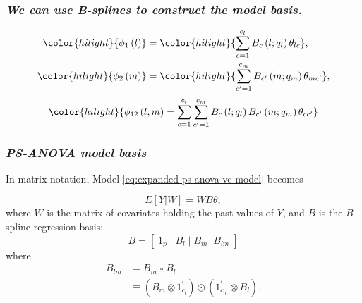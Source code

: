 \documentclass[12pt]{beamer}
\newcommand{\newmaththought}[1]{{ \color{hilight} {#1}}}
\begin{document}
\begin{frame}
\frametitle{\emph{We can use B-splines to construct the model basis.}}

\begin{align}  
\begin{split}\label{eq:l-m-marginal-basis}
\newmaththought{\phi_1\left(l\right) } &= \newmaththought{\sum_{c=1}^{c_l} B_{c}\left(l;q_l\right) \theta_{lc }}, \\
\newmaththought{\phi_2\left(m\right) } &= \newmaththought{\sum_{{c^\prime}=1}^{c_m} B_{c^\prime}\left(m;q_m\right)\theta_{mc^\prime } },
\end{split}
\end{align}
\begin{equation} \label{eq:PSANOVA-interaction-term} 
\newmaththought{ \phi_{12}\left(l,m\right)  = \sum_{c=1}^{c_l} \sum_{{c^\prime}=1}^{c_m} B_{c}\left(l;q_l\right) B_{c^\prime  }\left(m;q_m\right)\theta_{c c^\prime } }
\end{equation} 
\end{frame}


\begin{frame}
\frametitle{\emph{PS-ANOVA model basis}}

In matrix notation, Model \ref{eq:expanded-ps-anova-vc-model} becomes

\begin{equation*}  
E \left[ Y | W \right] = WB \theta,
\end{equation*}
\noindent
where $W$ is the matrix of covariates holding the past values of $Y$, and $B$ is the $B$-spline regression basis:
\begin{equation} \label{eq:SANOVA-basis-matrix}
B = \left[\; 1_p \; \vert \;  B_l  \; \vert \;   B_m \; \vert B_{lm} \; \right]
\end{equation}
\noindent
where 
\begin{align*} \label{eq:rowwise-kronecker-product}
B_{lm} &= B_m \; \square \; B_l \\
&\equiv \left( B_m \otimes 1^\prime_{c_l} \right) \odot \left(1^\prime_{c_m} \otimes  B_l  \right).
\end{align*}
\end{frame}
\end{document}
